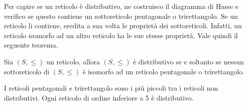	\begin{center}
\begin{minipage}{.45\textwidth}
	\centering
\end{minipage}
\hfil
\begin{minipage}{.45\textwidth}
	\centering
\end{minipage}
	\end{center}


Per capire se un reticolo è distributivo, ne costruisco il diagramma di Hasse e verifico se questo contiene un sottoreticolo pentagonale o trirettangolo. Se un reticolo li contiene, eredita a sua volta le proprietà dei sottoreticoli. Infatti, un reticolo isomorfo ad un altro reticolo ha le sue stesse proprietà. Vale quindi il seguente teorema.

\begin{teorbox}\label{thm:birkhoff}
	Sia $(S,\leq)$ un reticolo, allora $(S,\leq)$ è distributivo se e soltanto se nessun sottoreticolo di $(S,\leq)$ è isomorfo ad un reticolo pentagonale o trirettangolo.
\end{teorbox}

\begin{corolbox}
	I reticoli pentagonali e trirettangolo sono i più piccoli tra i reticoli non distributivi. Ogni reticolo di ordine inferiore a 5 è distributivo.
\end{corolbox}

